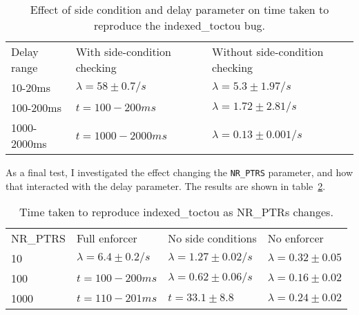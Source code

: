 \begin{table}
\begin{tabular}{lll}
Delay range  & With side-condition checking          & Without side-condition checking \\
10-20ms      & $\lambda = 58 \pm 0.7/s$              & $\lambda = 5.3 \pm 1.97/s$ \\
100-200ms    & $t = 100 - 200ms$                     & $\lambda = 1.72 \pm 2.81/s$ \\
1000-2000ms  & $t = 1000 - 2000ms$                   & $\lambda = 0.13 \pm 0.001/s$ \\
\end{tabular}
\caption{Effect of side condition and delay parameter on time taken to
  reproduce the indexed\_toctou bug.}  
\label{table:eval:indexedtoctou:delay}
\end{table}

As a final test, I investigated the effect changing the \verb|NR_PTRS|
parameter, and how that interacted with the delay parameter.  The
results are shown in table~\ref{table:eval:indexedtoctou:nrptrs}.



\begin{table}
\begin{tabular}{llll}
NR\_PTRS & Full enforcer             & No side conditions          & No enforcer               \\
10       & $\lambda = 6.4 \pm 0.2/s$ & $\lambda = 1.27 \pm 0.02/s$ & $\lambda = 0.32 \pm 0.05$ \\
100      & $t = 100 - 200ms$         & $\lambda = 0.62 \pm 0.06/s$ & $\lambda = 0.16 \pm 0.02$ \\
1000     & $t = 110 - 201ms$         & $t = 33.1 \pm 8.8$          & $\lambda = 0.24 \pm 0.02$ \\
\end{tabular}
\caption{Time taken to reproduce indexed\_toctou as NR\_PTRs changes.}
\label{table:eval:indexedtoctou:nrptrs}
\end{table}

